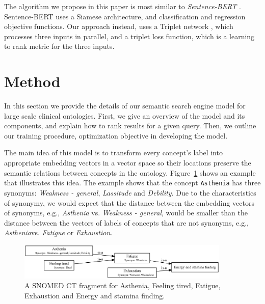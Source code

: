 \documentclass[preprint,12pt]{elsarticle}
\begin{document}
The algorithm we propose in this paper is most similar to \textit{Sentence-BERT} \cite{Reimers2019}. Sentence-BERT uses a Siamese architecture, and classification and regression objective functions. Our approach instead, uses a Triplet network \cite{Hoffer2015}, which processes three inputs in parallel, and a triplet loss function, which is a learning to rank metric for the three inputs.

\section*{Method}
\label{sec:Method}

In this section we provide the details of our semantic search engine model for large scale clinical ontologies. First, we give an overview of the model and its components, and explain how to rank results for a given query. Then, we outline our training procedure, optimization objective in developing the model.


The main idea of this model is to transform every concept's label into appropriate embedding vectors in a vector space so their locations preserve the semantic relations between concepts in the ontology. Figure~\ref{fig:Fatigue} shows an example that illustrates this idea. The example shows that the concept \texttt{Asthenia} has three synonyms: {\textit{Weakness - general}}, {\textit{Lassitude}} and {\textit{Debility}}. Due to the characteristics of synonymy, we would expect that the distance between the embedding vectors of synonyms, e.g., {\textit{Asthenia}} vs. {\textit{Weakness - general}}, would be smaller than the distance between the vectors of labels of concepts that are not synonyms, e.g., {\textit{Asthenia}}vs. {\textit{Fatigue}} or {\textit{Exhaustion}}.

\begin{figure}[htbp]
	\centering
		\includegraphics[width=0.9\textwidth]{figures/Asthenia.eps}
	\vspace{-0.5em}
	\caption{A SNOMED CT fragment for Asthenia, Feeling tired, Fatigue, Exhaustion and Energy and stamina finding.}
	\label{fig:Fatigue}
\end{figure}
\end{document}
